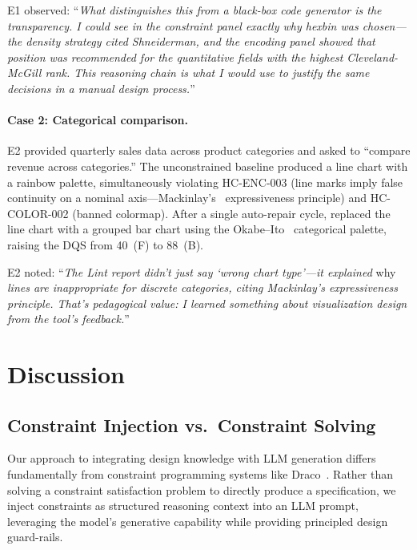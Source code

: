 E1 observed: ``\textit{What distinguishes this from a black-box code generator is the transparency. I could see in the constraint panel exactly why hexbin was chosen---the density strategy cited Shneiderman, and the encoding panel showed that position was recommended for the quantitative fields with the highest Cleveland-McGill rank. This reasoning chain is what I would use to justify the same decisions in a manual design process.}''

\paragraph{Case 2: Categorical comparison.}
E2 provided quarterly sales data across product categories and asked to ``compare revenue across categories.'' The unconstrained baseline produced a line chart with a rainbow palette, simultaneously violating HC-ENC-003 (line marks imply false continuity on a nominal axis---Mackinlay's~\cite{mackinlay1986automating} expressiveness principle) and HC-COLOR-002 (banned colormap). After a single auto-repair cycle, \sysname{} replaced the line chart with a grouped bar chart using the Okabe--Ito~\cite{okabe2008color} categorical palette, raising the DQS from 40~(F) to 88~(B).

E2 noted: ``\textit{The Lint report didn't just say `wrong chart type'---it explained} why \textit{lines are inappropriate for discrete categories, citing Mackinlay's expressiveness principle. That's pedagogical value: I learned something about visualization design from the tool's feedback.}''


\section{Discussion}
\label{sec:discussion}

\subsection{Constraint Injection vs.\ Constraint Solving}

Our approach to integrating design knowledge with LLM generation differs fundamentally from constraint programming systems like Draco~\cite{moritz2018formalizing}. Rather than solving a constraint satisfaction problem to directly produce a specification, we inject constraints as structured reasoning context into an LLM prompt, leveraging the model's generative capability while providing principled design guard-rails.

